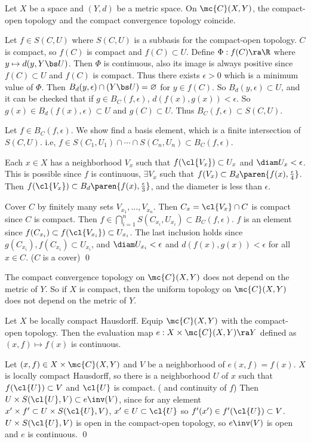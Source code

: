  Let \(X\) be a space and \((Y, d)\) be a metric space. On \(\mc{C}(X, Y)\), the compact-open topology and the compact convergence topology coincide.

\pf \note{\(\subset\)} Let \(f \in S(C, U)\) where \(S(C, U)\) is a subbasis for the compact-open topology. \(C\) is compact, so \(f(C)\) is compact and \(f(C) \subset U\). Define \(\Phi : f(C) \ra \R\) where \(y \mapsto d(y, Y \bs U)\). Then \(\Phi\) is continuous, also its image is always positive since \(f(C) \subset U\) and \(f(C)\) is compact. Thus there exists \(\epsilon > 0\) which is a minimum value of \(\Phi\). Then \(B_d(y, \epsilon) \cap (Y \bs U) = \varnothing\) for \(y \in f(C)\). So \(B_d(y, \epsilon) \subset U\), and it can be checked that if \(g \in B_C(f, \epsilon)\), \(d(f(x), g(x)) < \epsilon\). So \(g(x) \in B_d(f(x), \epsilon) \subset U\) and \(g(C) \subset U\). Thus \(B_C(f, \epsilon) \subset S(C, U)\).

\note{\(\supset\)} Let \(f \in B_C(f, \epsilon)\). We show find a basis element, which is a finite intersection of \(S(C, U)\). i.e, \(f \in S(C_1, U_1) \cap \cdots \cap S(C_n, U_n) \subset B_C(f, \epsilon)\).

Each \(x \in X\) has a neighborhood \(V_x\) such that \(f(\cl{V_x}) \subset U_x\) and \(\diam U_x < \epsilon\). This is possible since \(f\) is continuous, \(\exists V_x\) such that \(f(V_x) \subset B_d\paren{f(x), \frac{\epsilon}{4}}\). Then \(f(\cl{V_x}) \subset B_d\paren{f(x), \frac{\epsilon}{3}}\), and the diameter is less than \(\epsilon\).

Cover \(C\) by finitely many sets \(V_{x_1}, \dots, V_{x_n}\). Then \(C_x = \cl{V_x} \cap C\) is compact since \(C\) is compact. Then \(f \in \bigcap_{i=1}^n S(C_{x_i}, U_{x_i}) \subset B_C(f, \epsilon)\). \(f\) is an element since \(f(C_{x_i}) \subset f(\cl{V_{x_i}}) \subset U_{x_i}\). The last inclusion holds since \(g(C_{x_i}), f(C_{x_i}) \subset U_{x_i}\), and \(\diam U_{x_i} < \epsilon\) and \(d(f(x), g(x)) < \epsilon\) for all \(x \in C\). (\(C\) is a cover) \qed

 The compact convergence topology on \(\mc{C}(X, Y)\) does not depend on the metric of \(Y\). So if \(X\) is compact, then the uniform topology on \(\mc{C}(X, Y)\) does not depend on the metric of \(Y\).

 Let \(X\) be locally compact Hausdorff. Equip \(\mc{C}(X, Y)\) with the compact-open topology. Then the evaluation map \(e : X \times \mc{C}(X, Y) \ra Y\) defined as \((x, f) \mapsto f(x)\) is continuous.

\pf Let \((x, f) \in X \times \mc{C}(X, Y)\) and \(V\) be a neighborhood of \(e(x, f) = f(x)\). \(X\) is locally compact Hausdorff, so there is a neighborhood \(U\) of \(x\) such that \(f(\cl{U}) \subset V\) and \(\cl{U}\) is compact. ( and continuity of \(f\)) Then \(U \times S(\cl{U}, V) \subset e\inv(V)\), since for any element \(x' \times f' \subset U \times S(\cl{U}, V)\), \(x' \in  U \subset \cl{U}\) so \(f'(x') \in f'(\cl{U}) \subset V\). \(U \times S(\cl{U}, V)\) is open in the compact-open topology, so \(e\inv(V)\) is open and \(e\) is continuous. \qed

\pagebreak
